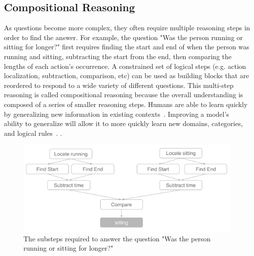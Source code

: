 \documentclass[10pt,twocolumn,letterpaper]{article}
\newcommand{\mgm}[1]{{\color{cyan}{mgm: #1}}}
\begin{document}


\subsection{Compositional Reasoning}

As questions become more complex, they often require multiple reasoning steps in order to find the answer. For example, the question "Was the person running or sitting for longer?" first requires finding the start and end of when the person was running and sitting, subtracting the start from the end, then comparing the lengths of each action's occurrence. A constrained set of logical steps (e.g. action localization, subtraction, comparison, etc) can be used as building blocks that are reordered to respond to a wide variety of different questions. This multi-step reasoning is called compositional reasoning because the overall understanding is composed of a series of smaller reasoning steps. Humans are able to learn quickly by generalizing new information in existing contexts~\cite{tani2014self,schulz2016probing}. Improving a model's ability to generalize will allow it to more quickly learn new domains, categories, and logical rules~\cite{lake2018generalization,vatashsky2020vqa}. . 


\begin{figure}[t]
\begin{center}
\includegraphics[width=0.8\linewidth]{Figures/figure_composition.png}
\end{center}
   \caption{The substeps required to answer the question "Was the person running or sitting for longer?"}
\label{compositional_substeps}
\end{figure}
\end{document}
